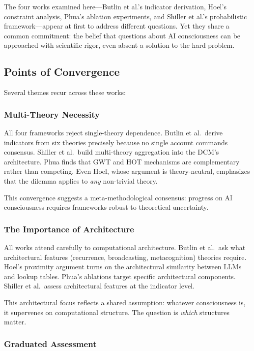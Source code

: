 The four works examined here---Butlin et al.'s indicator derivation, Hoel's constraint analysis, Phua's ablation experiments, and Shiller et al.'s probabilistic framework---appear at first to address different questions. Yet they share a common commitment: the belief that questions about AI consciousness can be approached with scientific rigor, even absent a solution to the hard problem.

\subsection{Points of Convergence}

Several themes recur across these works:

\subsubsection{Multi-Theory Necessity}

All four frameworks reject single-theory dependence. Butlin et al.\ derive indicators from six theories precisely because no single account commands consensus. Shiller et al.\ build multi-theory aggregation into the DCM's architecture. Phua finds that GWT and HOT mechanisms are complementary rather than competing. Even Hoel, whose argument is theory-neutral, emphasizes that the dilemma applies to \emph{any} non-trivial theory.

This convergence suggests a meta-methodological consensus: progress on AI consciousness requires frameworks robust to theoretical uncertainty.

\subsubsection{The Importance of Architecture}

All works attend carefully to computational architecture. Butlin et al.\ ask what architectural features (recurrence, broadcasting, metacognition) theories require. Hoel's proximity argument turns on the architectural similarity between LLMs and lookup tables. Phua's ablations target specific architectural components. Shiller et al.\ assess architectural features at the indicator level.

This architectural focus reflects a shared assumption: whatever consciousness is, it supervenes on computational structure. The question is \emph{which} structures matter.

\subsubsection{Graduated Assessment}

